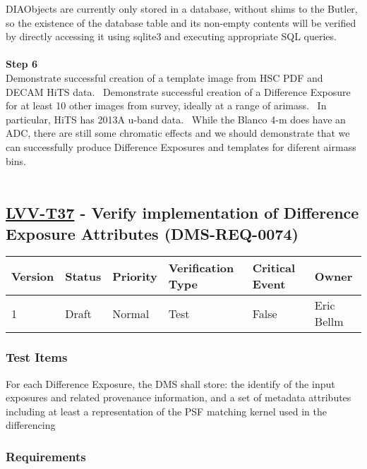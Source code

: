 DIAObjects are currently only stored in a database, without shims to the
Butler, so the existence of the database table and its non-empty
contents will be verified by directly accessing it using sqlite3 and
executing appropriate SQL queries.\\
~\\
\textbf{Step 6}\\
Demonstrate successful creation of a template image from HSC PDF and
DECAM HiTS data. ~Demonstrate successful creation of a Difference
Exposure for at least 10 other images from survey, ideally at a range of
arimass. ~In particular, HiTS has 2013A u-band data. ~While the Blanco
4-m does have an ADC, there are still some chromatic effects and we
should demonstrate that we can successfully produce Difference Exposures
and templates for diferent airmass bins.\\
~\\

\hypertarget{lvv-t37---verify-implementation-of-difference-exposure-attributes-dms-req-0074}{%
\subsection{\texorpdfstring{\href{https://jira.lsstcorp.org/secure/Tests.jspa\#/testCase/LVV-T37}{LVV-T37}
- Verify implementation of Difference Exposure Attributes
(DMS-REQ-0074)}{LVV-T37 - Verify implementation of Difference Exposure Attributes (DMS-REQ-0074)}}\label{lvv-t37---verify-implementation-of-difference-exposure-attributes-dms-req-0074}}

\begin{longtable}[]{@{}llllll@{}}
\toprule
Version & Status & Priority & Verification Type & Critical Event &
Owner\tabularnewline
\midrule
\endhead
1 & Draft & Normal & Test & False & Eric Bellm\tabularnewline
\bottomrule
\end{longtable}

\hypertarget{test-items-13}{%
\subsubsection{Test Items}\label{test-items-13}}

For each Difference Exposure, the DMS shall store: the identify of the
input exposures and related provenance information, and a set of
metadata attributes including at least a representation of the PSF
matching kernel used in the differencing

\hypertarget{requirements-14}{%
\subsubsection{Requirements}\label{requirements-14}}

